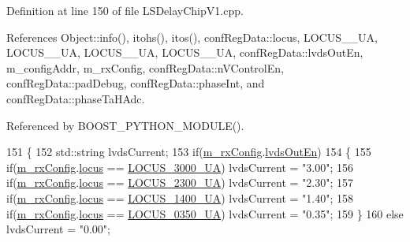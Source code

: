 Definition at line 150 of file L\+S\+Delay\+Chip\+V1.\+cpp.



References Object\+::info(), itohs(), itos(), conf\+Reg\+Data\+::locus, L\+O\+C\+U\+S\+\_\+\_\+\+UA, L\+O\+C\+U\+S\+\_\+\_\+\+UA, L\+O\+C\+U\+S\+\_\+\_\+\+UA, L\+O\+C\+U\+S\+\_\+\_\+\+UA, conf\+Reg\+Data\+::lvds\+Out\+En, m\+\_\+config\+Addr, m\+\_\+rx\+Config, conf\+Reg\+Data\+::n\+V\+Control\+En, conf\+Reg\+Data\+::pad\+Debug, conf\+Reg\+Data\+::phase\+Int, and conf\+Reg\+Data\+::phase\+Ta\+H\+Adc.



Referenced by B\+O\+O\+S\+T\+\_\+\+P\+Y\+T\+H\+O\+N\+\_\+\+M\+O\+D\+U\+L\+E().


\begin{DoxyCode}
151 \{
152     std::string lvdsCurrent;    
153     \textcolor{keywordflow}{if}(\hyperlink{classLSDelayChipV1_a4818ac5c0d7ccf2845a01226234bdb67}{m\_rxConfig}.\hyperlink{structconfRegData_a709d8d691ef0c8ea5c4c03aac3d851f1}{lvdsOutEn})
154     \{
155         \textcolor{keywordflow}{if}(\hyperlink{classLSDelayChipV1_a4818ac5c0d7ccf2845a01226234bdb67}{m\_rxConfig}.\hyperlink{structconfRegData_a0ed9976dd55237ee70ba3621b0f4f58c}{locus} == \hyperlink{LSDelayChipV1_8h_a9dbbe19d91a9e4d61f7291c5aeabce63a259de7b287dcc219dd6cda577c9ebc4c}{LOCUS\_3000\_UA}) lvdsCurrent = \textcolor{stringliteral}{"3.00"};
156         \textcolor{keywordflow}{if}(\hyperlink{classLSDelayChipV1_a4818ac5c0d7ccf2845a01226234bdb67}{m\_rxConfig}.\hyperlink{structconfRegData_a0ed9976dd55237ee70ba3621b0f4f58c}{locus} == \hyperlink{LSDelayChipV1_8h_a9dbbe19d91a9e4d61f7291c5aeabce63a06d3e527062b8ffd220520be69e0d4e6}{LOCUS\_2300\_UA}) lvdsCurrent = \textcolor{stringliteral}{"2.30"};
157         \textcolor{keywordflow}{if}(\hyperlink{classLSDelayChipV1_a4818ac5c0d7ccf2845a01226234bdb67}{m\_rxConfig}.\hyperlink{structconfRegData_a0ed9976dd55237ee70ba3621b0f4f58c}{locus} == \hyperlink{LSDelayChipV1_8h_a9dbbe19d91a9e4d61f7291c5aeabce63aaf5de18b5633f00e781bb74b6c3850d3}{LOCUS\_1400\_UA}) lvdsCurrent = \textcolor{stringliteral}{"1.40"};
158         \textcolor{keywordflow}{if}(\hyperlink{classLSDelayChipV1_a4818ac5c0d7ccf2845a01226234bdb67}{m\_rxConfig}.\hyperlink{structconfRegData_a0ed9976dd55237ee70ba3621b0f4f58c}{locus} == \hyperlink{LSDelayChipV1_8h_a9dbbe19d91a9e4d61f7291c5aeabce63abcd44318e3bbcab80cb33b8ac0638fa0}{LOCUS\_0350\_UA}) lvdsCurrent = \textcolor{stringliteral}{"0.35"};     
159     \}
160     \textcolor{keywordflow}{else} lvdsCurrent = \textcolor{stringliteral}{"0.00"};

\end{DoxyCode}
